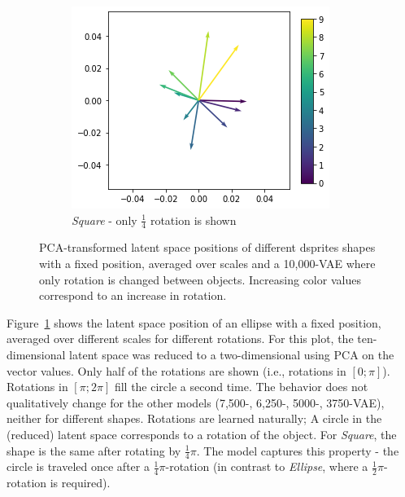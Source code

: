 \begin{figure}
    \hfill
    \begin{subfigure}{.3\textwidth}
        \includegraphics[width=\textwidth]{images/latent_space_traversals/vae_dsprites_orientation_latent_space_square.png}
        \caption{\textit{Square} - only $\frac{1}{4}$ rotation is shown}
    \end{subfigure}
    \caption[10,000-VAE - Rotation latent space]{PCA-transformed latent space positions of different dsprites shapes with a fixed position, averaged over scales and a 10,000-VAE where only rotation is changed between objects. Increasing color values correspond to an increase in rotation. }
    \label{fig:vae_dsprites_rotation_latent_space_vae_10000}
\end{figure}

Figure~\ref{fig:vae_dsprites_rotation_latent_space_vae_10000} shows the latent space position of an ellipse with a fixed position, averaged over different scales for different rotations.
For this plot, the ten-dimensional latent space was reduced to a two-dimensional using \ac{PCA} on the vector values.
Only half of the rotations are shown (i.e., rotations in $[0;\pi]$).
Rotations in $[\pi; 2\pi]$ fill the circle a second time.
The behavior does not qualitatively change for the other models (7,500-, 6,250-, 5000-, 3750-\ac{VAE}), neither for different shapes.
Rotations are learned naturally;
A circle in the (reduced) latent space corresponds to a rotation of the object.
For \textit{Square}, the shape is the same after rotating by $\frac{1}{4}\pi$.
The model captures this property - the circle is traveled once after a $\frac{1}{4}\pi$-rotation (in contrast to \textit{Ellipse}, where a $\frac{1}{2}\pi$-rotation is required).

